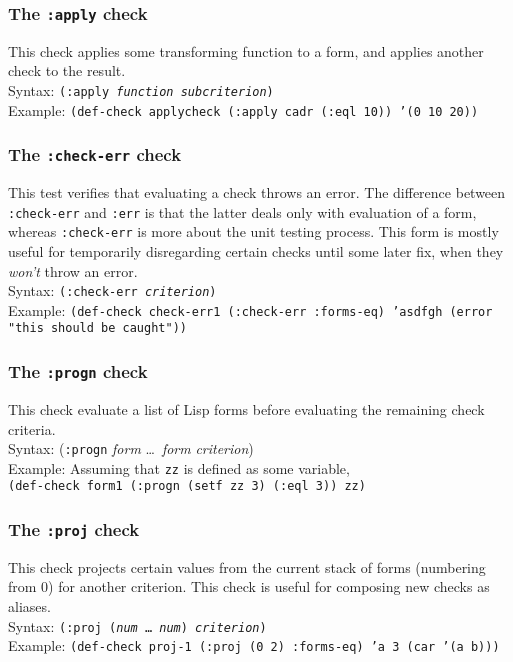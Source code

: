 \documentclass{article}
\begin{document}
\subsubsection{The \texttt{:apply} check}
This check applies some transforming function to a form, and applies
another check to the result.
\\ Syntax: \texttt{(:apply \textit{function} \textit{subcriterion})}
\\ Example: \texttt{(def-check applycheck (:apply cadr (:eql 10)) '(0 10 20))}

\subsubsection{The \texttt{:check-err} check}
This test verifies that evaluating a check throws an
error. The difference between
\texttt{:check-err} and \texttt{:err} is that the latter deals only
with evaluation of a form, whereas \texttt{:check-err} is more about
the unit testing process.  This form is mostly useful for temporarily
disregarding certain checks until some later fix, when they
\emph{won't} throw an error.
%
\\ Syntax: \texttt{(:check-err \textit{criterion})}
\\ Example: \texttt{(def-check check-err1 (:check-err :forms-eq) 'asdfgh (error "this should be caught"))}

\subsubsection{The \texttt{:progn} check}
This check evaluate a list of Lisp forms before evaluating the
remaining check criteria.
\\ Syntax: (\texttt{:progn} \textit{form} \ldots\ \textit{form} \textit{criterion})
\\ Example: Assuming that \texttt{zz} is defined as some variable,
\\ \hspace*{2em}\texttt{(def-check form1 (:progn (setf zz 3) (:eql 3)) zz)}

\subsubsection{The \texttt{:proj} check}
This check projects certain values from the current stack of forms
(numbering from 0) for another criterion.  This check is useful for
composing new checks as aliases.
\\ Syntax: \texttt{(:proj (\textit{num} \ldots\  \textit{num}) \textit{criterion})}
\\ Example: \texttt{(def-check proj-1 (:proj (0 2) :forms-eq) 'a 3 (car '(a b)))}
\end{document}
